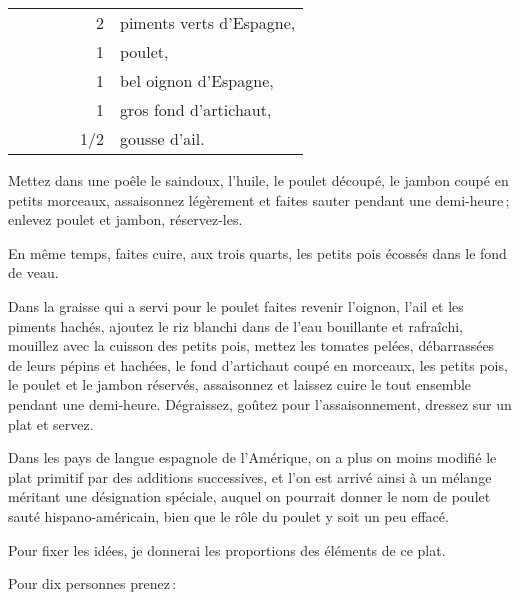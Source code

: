 \begin{longtable}{rrrrrp{18em}}
    &               &       &         &   2 & piments verts d'Espagne,                                    \\
    &               &       &         &   1 & poulet,                                                     \\
    &               &       &         &   1 & bel oignon d'Espagne,                                       \\
    &               &       &         &   1 & gros fond d'artichaut,                                      \\
    &               &       &         & 1/2 & gousse d'ail.                                               \\
\end{longtable}
\normalsize

Mettez dans une poêle le saindoux, l'huile, le poulet découpé, le jambon coupé
en petits morceaux, assaisonnez légèrement et faites sauter pendant une
demi-heure ; enlevez poulet et jambon, réservez-les.

En même temps, faites cuire, aux trois quarts, les petits pois écossés dans le
fond de veau.

Dans la graisse qui a servi pour le poulet faites revenir l'oignon, l'ail et
les piments hachés, ajoutez le riz blanchi dans de l'eau bouillante et
rafraîchi, mouillez avec la cuisson des petits pois, mettez les tomates pelées,
débarrassées de leurs pépins et hachées, le fond d'artichaut coupé en morceaux,
les petits pois, le poulet et le jambon réservés, assaisonnez et laissez cuire
le tout ensemble pendant une demi-heure. Dégraissez, goûtez pour
l’assaisonnement, dressez sur un plat et servez.

\sk

Dans les pays de langue espagnole de l'Amérique, on a plus on moins modifié le
plat primitif par des additions successives, et l'on est arrivé ainsi à un
mélange méritant une désignation spéciale, auquel on pourrait donner le nom de
poulet sauté hispano-américain, bien que le rôle du poulet y soit un peu
effacé.

Pour fixer les idées, je donnerai les proportions des éléments de ce plat.

\medskip

Pour dix personnes prenez :

